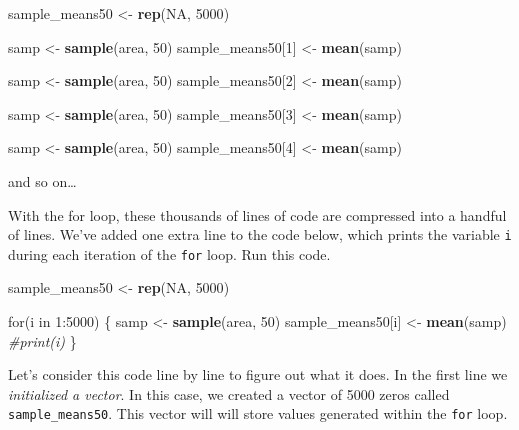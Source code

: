 \documentclass[]{book}
\newenvironment{Shaded}{\begin{snugshade}}{\end{snugshade}}
\newcommand{\KeywordTok}[1]{\textcolor[rgb]{0.13,0.29,0.53}{\textbf{{#1}}}}
\newcommand{\DecValTok}[1]{\textcolor[rgb]{0.00,0.00,0.81}{{#1}}}
\newcommand{\StringTok}[1]{\textcolor[rgb]{0.31,0.60,0.02}{{#1}}}
\newcommand{\CommentTok}[1]{\textcolor[rgb]{0.56,0.35,0.01}{\textit{{#1}}}}
\newcommand{\OtherTok}[1]{\textcolor[rgb]{0.56,0.35,0.01}{{#1}}}
\newcommand{\NormalTok}[1]{{#1}}
\theoremstyle{definition}
\theoremstyle{definition}
\theoremstyle{remark}
\begin{document}
\begin{Shaded}
\begin{Highlighting}[]
\NormalTok{sample_means50 <-}\StringTok{ }\KeywordTok{rep}\NormalTok{(}\OtherTok{NA}\NormalTok{, }\DecValTok{5000}\NormalTok{)}

\NormalTok{samp <-}\StringTok{ }\KeywordTok{sample}\NormalTok{(area, }\DecValTok{50}\NormalTok{)}
\NormalTok{sample_means50[}\DecValTok{1}\NormalTok{] <-}\StringTok{ }\KeywordTok{mean}\NormalTok{(samp)}

\NormalTok{samp <-}\StringTok{ }\KeywordTok{sample}\NormalTok{(area, }\DecValTok{50}\NormalTok{)}
\NormalTok{sample_means50[}\DecValTok{2}\NormalTok{] <-}\StringTok{ }\KeywordTok{mean}\NormalTok{(samp)}

\NormalTok{samp <-}\StringTok{ }\KeywordTok{sample}\NormalTok{(area, }\DecValTok{50}\NormalTok{)}
\NormalTok{sample_means50[}\DecValTok{3}\NormalTok{] <-}\StringTok{ }\KeywordTok{mean}\NormalTok{(samp)}

\NormalTok{samp <-}\StringTok{ }\KeywordTok{sample}\NormalTok{(area, }\DecValTok{50}\NormalTok{)}
\NormalTok{sample_means50[}\DecValTok{4}\NormalTok{] <-}\StringTok{ }\KeywordTok{mean}\NormalTok{(samp)}
\end{Highlighting}
\end{Shaded}

and so on\ldots{}

With the for loop, these thousands of lines of code are compressed into
a handful of lines. We've added one extra line to the code below, which
prints the variable \texttt{i} during each iteration of the \texttt{for}
loop. Run this code.

\begin{Shaded}
\begin{Highlighting}[]
\NormalTok{sample_means50 <-}\StringTok{ }\KeywordTok{rep}\NormalTok{(}\OtherTok{NA}\NormalTok{, }\DecValTok{5000}\NormalTok{)}

\NormalTok{for(i in }\DecValTok{1}\NormalTok{:}\DecValTok{5000}\NormalTok{) \{}
   \NormalTok{samp <-}\StringTok{ }\KeywordTok{sample}\NormalTok{(area, }\DecValTok{50}\NormalTok{)}
   \NormalTok{sample_means50[i] <-}\StringTok{ }\KeywordTok{mean}\NormalTok{(samp)}
   \CommentTok{#print(i)}
\NormalTok{\}}
\end{Highlighting}
\end{Shaded}

Let's consider this code line by line to figure out what it does. In the
first line we \emph{initialized a vector}. In this case, we created a
vector of 5000 zeros called \texttt{sample\_means50}. This vector will
will store values generated within the \texttt{for} loop.
\end{document}
